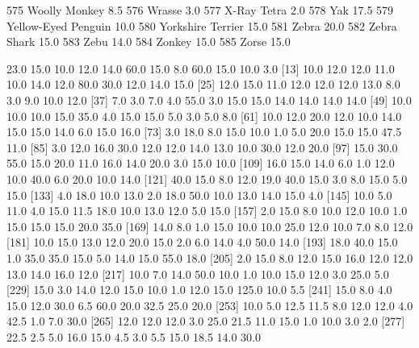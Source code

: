 \documentclass[a4paper]{article}
\begin{document}
\begin{Schunk}
\begin{Soutput}
575                  Woolly Monkey      8.5
576                         Wrasse      3.0
577                    X-Ray Tetra      2.0
578                            Yak     17.5
579            Yellow-Eyed Penguin     10.0
580              Yorkshire Terrier     15.0
581                          Zebra     20.0
582                    Zebra Shark     15.0
583                           Zebu     14.0
584                         Zonkey     15.0
585                          Zorse     15.0
\end{Soutput}
\begin{Soutput}
  [1]  23.0  15.0  10.0  12.0  14.0  60.0  15.0   8.0  60.0  15.0  10.0   3.0
 [13]  10.0  12.0  12.0  11.0  10.0  14.0  12.0  80.0  30.0  12.0  14.0  15.0
 [25]  12.0  15.0  11.0  12.0  12.0  12.0  13.0   8.0   3.0   9.0  10.0  12.0
 [37]   7.0   3.0   7.0   4.0  55.0   3.0  15.0  15.0  14.0  14.0  14.0  14.0
 [49]  10.0  10.0  10.0  15.0  35.0   4.0  15.0  15.0   5.0   3.0   5.0   8.0
 [61]  10.0  12.0  20.0  12.0  10.0  14.0  15.0  15.0  14.0   6.0  15.0  16.0
 [73]   3.0  18.0   8.0  15.0  10.0   1.0   5.0  20.0  15.0  15.0  47.5  11.0
 [85]   3.0  12.0  16.0  30.0  12.0  12.0  14.0  13.0  10.0  30.0  12.0  20.0
 [97]  15.0  30.0  55.0  15.0  20.0  11.0  16.0  14.0  20.0   3.0  15.0  10.0
[109]  16.0  15.0  14.0   6.0   1.0  12.0  10.0  40.0   6.0  20.0  10.0  14.0
[121]  40.0  15.0   8.0  12.0  19.0  40.0  15.0   3.0   8.0  15.0   5.0  15.0
[133]   4.0  18.0  10.0  13.0   2.0  18.0  50.0  10.0  13.0  14.0  15.0   4.0
[145]  10.0   5.0  11.0   4.0  15.0  11.5  18.0  10.0  13.0  12.0   5.0  15.0
[157]   2.0  15.0   8.0  10.0  12.0  10.0   1.0  15.0  15.0  15.0  20.0  35.0
[169]  14.0   8.0   1.0  15.0  10.0  10.0  25.0  12.0  10.0   7.0   8.0  12.0
[181]  10.0  15.0  13.0  12.0  20.0  15.0   2.0   6.0  14.0   4.0  50.0  14.0
[193]  18.0  40.0  15.0   1.0  35.0  35.0  15.0   5.0  14.0  15.0  55.0  18.0
[205]   2.0  15.0   8.0  12.0  15.0  16.0  12.0  12.0  13.0  14.0  16.0  12.0
[217]  10.0   7.0  14.0  50.0  10.0   1.0  10.0  15.0  12.0   3.0  25.0   5.0
[229]  15.0   3.0  14.0  12.0  15.0  10.0   1.0  12.0  15.0 125.0  10.0   5.5
[241]  15.0   8.0   4.0  15.0  12.0  30.0   6.5  60.0  20.0  32.5  25.0  20.0
[253]  10.0   5.0  12.5  11.5   8.0  12.0  12.0   4.0  42.5   1.0   7.0  30.0
[265]  12.0  12.0  12.0   3.0  25.0  21.5  11.0  15.0   1.0  10.0   3.0   2.0
[277]  22.5   2.5   5.0  16.0  15.0   4.5   3.0   5.5  15.0  18.5  14.0  30.0

\end{Soutput}
\end{Schunk}
\end{document}
